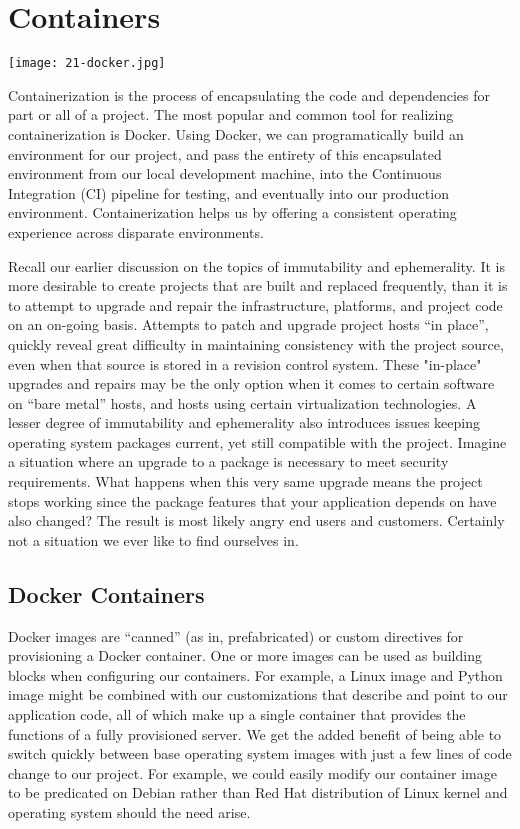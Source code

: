 \chapter{Containers}

\texttt{[image: 21-docker.jpg]}

\justifying
Containerization is the process of encapsulating the code and dependencies for part or all of a project. The most popular
and common tool for realizing containerization is Docker. Using Docker, we can programatically build an
environment for our project, and pass the entirety of this encapsulated environment from our local
development machine, into the Continuous Integration (CI) pipeline for testing, and eventually
into our production environment. Containerization helps us by offering a consistent operating
experience across disparate environments.

\justifying
Recall our earlier discussion on the topics of immutability and ephemerality. It is more desirable
to create projects that are built and replaced frequently, than it is to attempt to upgrade and repair the infrastructure,
platforms, and project code on an on-going basis. Attempts to patch and upgrade project hosts ``in place'', quickly reveal
great difficulty in maintaining consistency with the project source, even when that source is stored in a revision control system.
These "in-place" upgrades and repairs may be the only option when it comes to certain software on ``bare metal'' hosts, and
hosts using certain virtualization technologies. A lesser degree of immutability
and ephemerality also introduces issues keeping
operating system packages current, yet still compatible with the project. Imagine a situation where an upgrade to a package
is necessary to meet security requirements. What happens when this very same
upgrade means the project stops working since the package features that your application depends on have also changed?
The result is most likely angry end users and customers. Certainly not a situation we ever like to find ourselves in.

\section{Docker Containers}

\justifying
Docker images are ``canned'' (as in, prefabricated) or custom directives for provisioning a Docker container. One or more
images can be used as building blocks when configuring our containers. For example, a Linux image and Python image might
be combined with our customizations that describe and point to our application code, all of which make up a single container
that provides the functions of a fully provisioned server. We get the added
benefit of being able to switch quickly between base operating system images with just a few lines of code change to our
project. For example, we could easily modify our container image to be predicated on Debian
rather than Red Hat distribution of Linux kernel and operating system should the need arise.

